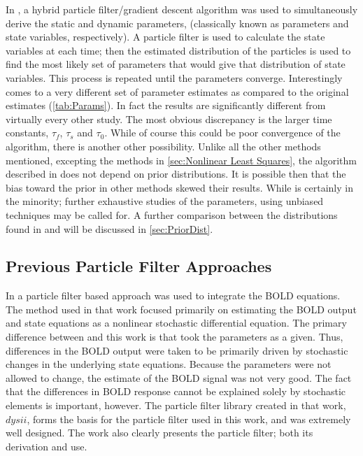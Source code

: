 In \cite{Johnston2008}, a hybrid particle filter/gradient
descent algorithm was used to simultaneously derive the static and dynamic 
parameters, (classically known as parameters and state variables, respectively).
A particle filter is used to calculate the state variables at each
time; then the estimated distribution of the particles is used to find
the most likely set of parameters that would give that distribution of state variables.
This process is repeated until the parameters converge. Interestingly
\cite{Johnston2008} comes to a very different set of parameter estimates as compared
to the original \cite{Friston2000} estimates (\autoref{tab:Params}). In fact the results 
are significantly different from virtually every other study. The most obvious discrepancy
is the larger time constants, $\tau_f$, $\tau_s$ and $\tau_0$. 
While of course this could be poor convergence of the algorithm, there is another other possibility.
Unlike all the other methods mentioned, excepting the methods in \autoref{sec:Nonlinear Least Squares},
the algorithm described in \cite{Johnston2008} does not depend on prior distributions.
It is possible then that the bias toward the prior in other methods skewed their results. 
While \cite{Johnston2008} is certainly in the minority; further exhaustive studies 
of the parameters, using unbiased techniques may be called for. A further 
comparison between the distributions found in \cite{Johnston2008} and 
\cite{Friston2000} will be discussed in \autoref{sec:PriorDist}.

\subsection{Previous Particle Filter Approaches}
In \cite{Murray2008} a particle filter based approach was used to integrate
the BOLD equations. The method used in that work focused primarily on estimating
the BOLD output and state equations as a nonlinear stochastic differential 
equation. The primary difference between \cite{Murray2008} and this work is that
\cite{Murray2008} took the parameters as a given. Thus, differences in the BOLD output
were taken to be primarily driven by stochastic changes in the underlying state
equations. Because the parameters were not allowed to change, the estimate of 
the BOLD signal was not very good. The fact that the
differences in BOLD response cannot be explained solely by stochastic elements 
is important, however. The particle filter library created
in that work, $dysii$, forms the basis for the particle filter used in this work, 
and was extremely well designed. The work also clearly presents the particle filter;
both its derivation and use. 

